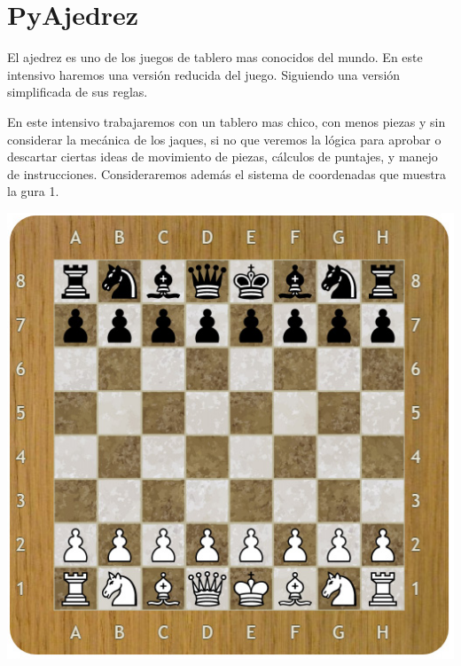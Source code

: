 \section*{PyAjedrez}

El ajedrez es uno de los juegos de tablero mas conocidos del mundo. En este intensivo haremos una versión reducida del juego. Siguiendo una versión simplificada de sus reglas.

En este intensivo trabajaremos con un tablero mas chico, con menos piezas y sin considerar la mecánica de
los jaques, si no que veremos la lógica para aprobar o descartar ciertas ideas de movimiento de piezas, cálculos
de puntajes, y manejo de instrucciones. Consideraremos además el sistema de coordenadas que muestra la
gura 1.

\vspace{3cm}

\begin{center}
    \includegraphics[scale=1]{Imagenes/tablero.png}
\end{center}


